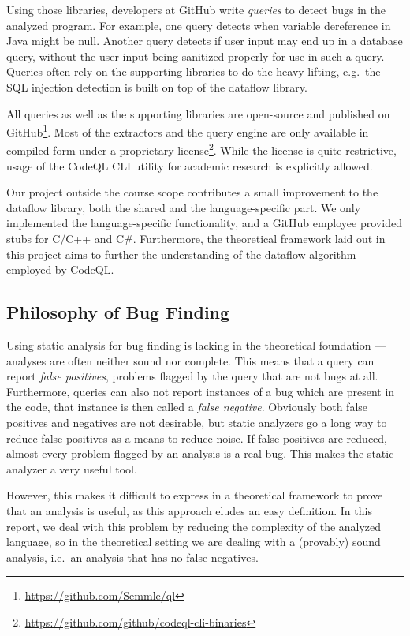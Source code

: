 Using those libraries, developers at GitHub write \emph{queries} to detect bugs in the analyzed program.
For example, one query detects when variable dereference in Java might be null.
Another query detects if user input may end up in a database query, without the user input being 
sanitized properly for use in such a query.
Queries often rely on the supporting libraries to do the heavy lifting, e.g.\ the SQL injection detection 
is built on top of the dataflow library.

All queries as well as the supporting libraries are open-source and published 
on GitHub\footnote{\url{https://github.com/Semmle/ql}}.
Most of the extractors and the query engine are only available in compiled form under a 
proprietary license\footnote{\url{https://github.com/github/codeql-cli-binaries}}.
While the license is quite restrictive,
usage of the CodeQL CLI utility for academic research is explicitly allowed.

Our project outside the course scope contributes a small improvement to the dataflow library,
both the shared and the language-specific part. We only implemented the language-specific 
functionality, and a GitHub employee provided stubs for C/C++ and C\#.
Furthermore, the theoretical framework laid out in this project aims to further the understanding
of the dataflow algorithm employed by CodeQL.

\subsection{Philosophy of Bug Finding}
Using static analysis for bug finding is lacking in the theoretical foundation {---} 
analyses are often neither sound nor complete.
This means that a query can report \emph{false positives}, problems flagged by the query that 
are not bugs at all.
Furthermore, queries can also not report instances of a bug which are present in the code,
that instance is then called a \emph{false negative}.
Obviously both false positives and negatives are not desirable, but static analyzers go a long way
to reduce false positives as a means to reduce noise.
If false positives are reduced, almost every problem flagged by an analysis is a real bug.
This makes the static analyzer a very useful tool.

However, this makes it difficult to express in a theoretical framework to prove that 
an analysis is useful, as this approach eludes an easy definition.
In this report, we deal with this problem by reducing the complexity of the analyzed language,
so in the theoretical setting we are dealing with a (provably) sound analysis, i.e.\ 
an analysis that has no false negatives.

